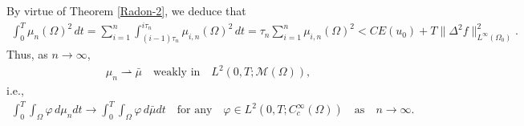 \documentclass[12pt]{amsart}
\begin{document}
By virtue of Theorem \ref{Radon-2}, we deduce that 
\begin{align*}
\int^T_0 \mu_n(\Omega)^2 \, dt = \sum^{n}_{i=1} \int^{i \tau_n}_{(i-1) \tau_n} \mu_{i,n}(\Omega)^2 \, dt  
= \tau_n \sum^{n}_{i=1} \mu_{i,n}(\Omega)^2 
< C E(u_0) + T \| \Delta^2 f \|_{L^{\infty}(\Omega_0)}^2. 
\end{align*}
Thus, as $n \to \infty$, 
\begin{align*}
\mu_n \rightharpoonup \bar{\mu} \quad \text{weakly in} \quad L^2(0,T; {\mathcal{M}}(\Omega)), 
\end{align*}
i.e., 
\begin{align*}
\int^T_0 \!\!\! \int_\Omega {\varphi}\, d \mu_n dt \to \int^T_0 \!\!\! \int_\Omega {\varphi}\, d \bar{\mu} dt 
\quad \text{for any} \quad {\varphi} \in L^2(0,T; C^\infty_c(\Omega)) \quad \text{as} \quad n \to \infty. 
\end{align*}
\end{document}
